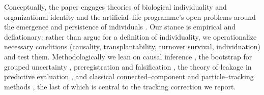 \documentclass[11pt]{article}
\begin{document}
Conceptually, the paper engages theories of biological individuality and organizational identity
\citep{godfreysmith2009,varela1974,maturana1980,ashby1947,ashby1952} and the artificial--life programme's open
problems around the emergence and persistence of individuals \citep{bedau2000}. Our stance is empirical and
deflationary: rather than argue for a definition of individuality, we operationalize necessary conditions
(causality, transplantability, turnover survival, individuation) and test them. Methodologically we lean on causal
inference \citep{pearl2009,rubin1974,pearl1995}, the bootstrap for grouped uncertainty \citep{efron1979},
preregistration and falsification \citep{nosek2018,popper1959}, the theory of leakage in predictive evaluation
\citep{kaufman2012}, and classical connected--component and particle--tracking methods \citep{rosenfeld1966,jaqaman2008},
the last of which is central to the tracking correction we report.
\end{document}
